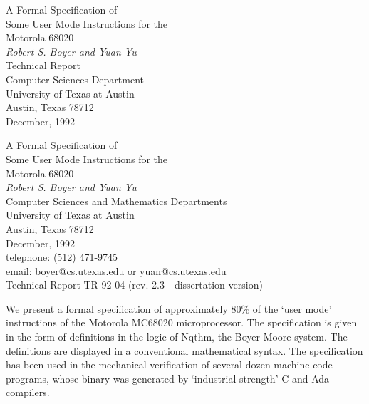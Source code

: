 \begin{center}
\Large
\vspace*{2in}
A Formal Specification of\\
Some User Mode Instructions for the \\
Motorola 68020\\[.25in]

{\em Robert S. Boyer {\em and} Yuan Yu}\\[.25in]

\large
Technical Report  \\
Computer Sciences Department \\
University of Texas at Austin\\
Austin, Texas 78712\\[.25in]

December, 1992\\[.25in]
\end{center}
\newpage
\tableofcontents

\newpage
{}

\begin{center}
\Large

A Formal Specification of\\
Some User Mode Instructions for the \\
Motorola 68020{\normalsize \footnotemark} \\[.25in]

{\em Robert S. Boyer {\em and} Yuan Yu}\\[.25in]

\large
Computer Sciences and Mathematics Departments \\
University of Texas at Austin\\
Austin, Texas 78712\\[.25in]

December, 1992\\[.25in]

\normalsize
telephone: (512) 471-9745\\
email: boyer@cs.utexas.edu or yuan@cs.utexas.edu\\[.25in]
Technical Report  TR-92-04 (rev. 2.3 - dissertation version)\\
\end{center}


\vspace{.10in}
We present a formal specification of approximately 80\% of the `user
mode' instructions of the Motorola MC68020 microprocessor.  The
specification is given in the form of definitions in the logic of
Nqthm, the Boyer-Moore system.  The definitions are displayed in a
conventional mathematical syntax.  The specification has been used in
the mechanical verification of several dozen machine code programs,
whose binary was generated by `industrial strength' C and Ada
compilers.

